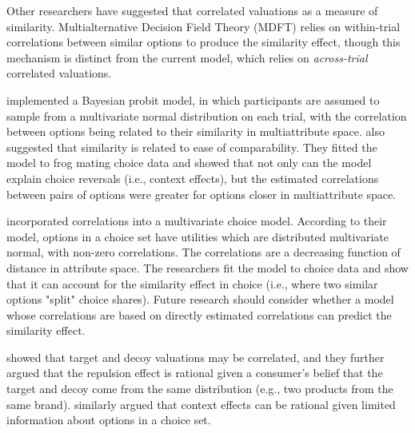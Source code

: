 Other researchers have suggested that correlated valuations as a measure of similarity. Multialternative Decision Field Theory (MDFT) \parencite{roeMultialternativeDecisionField2001a} relies on within-trial correlations between similar options to produce the similarity effect, though this mechanism is distinct from the current model, which relies on \textit{across-trial} correlated valuations. 

\textcite{natenzon2019random} implemented a Bayesian probit model, in which participants are assumed to sample from a multivariate normal distribution on each trial, with the correlation between options being related to their similarity in multiattribute space. \textcite{natenzon2019random} also suggested that similarity is related to ease of comparability. They fitted the model to frog mating choice data and showed that not only can the model explain choice reversals (i.e., context effects), but the estimated correlations between pairs of options were greater for options closer in multiattribute space. 

\textcite{kamakura1984predicting} incorporated correlations into a multivariate choice model. According to their model, options in a choice set have utilities which are distributed multivariate normal, with non-zero correlations. The correlations are a decreasing function of distance in attribute space. The researchers fit the model to choice data and show that it can account for the similarity effect in choice (i.e., where two similar options "split" choice shares). Future research should consider whether a model whose correlations are based on directly estimated correlations can predict the similarity effect. 

\textcite{bhui2021rational} showed that target and decoy valuations may be correlated, and they further argued that the repulsion effect is rational given a consumer's belief that the target and decoy come from the same distribution (e.g., two products from the same brand). \textcite{bhui2024context} similarly argued that context effects can be rational given limited information about options in a choice set. 


